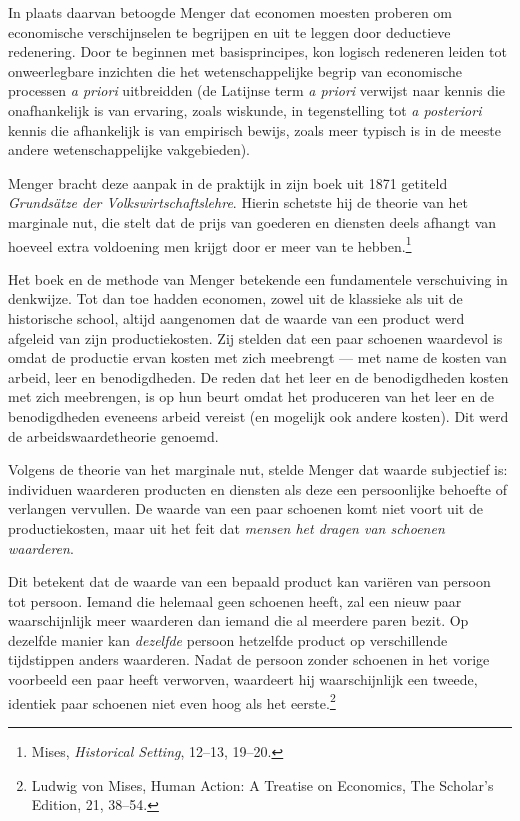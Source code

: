 \documentclass[
  a5paper,
  smalldemyvopaper,11pt,twoside,onecolumn,openright,extrafontsizes,
hidelinks]{memoir}
\begin{document}
In plaats daarvan betoogde Menger dat economen moesten proberen om
economische verschijnselen te begrijpen en uit te leggen door deductieve
redenering. Door te beginnen met basisprincipes, kon logisch redeneren
leiden tot onweerlegbare inzichten die het wetenschappelijke begrip van
economische processen \emph{a priori} uitbreidden (de Latijnse term
\emph{a priori} verwijst naar kennis die onafhankelijk is van ervaring,
zoals wiskunde, in tegenstelling tot \emph{a posteriori} kennis die
afhankelijk is van empirisch bewijs, zoals meer typisch is in de meeste
andere wetenschappelijke vakgebieden).

Menger bracht deze aanpak in de praktijk in zijn boek uit 1871 getiteld
\emph{Grundsätze der Volkswirtschaftslehre}. Hierin schetste hij de
theorie van het marginale nut, die stelt dat de prijs van goederen en
diensten deels afhangt van hoeveel extra voldoening men krijgt door er
meer van te hebben.\footnote{\hspace{0pt}Mises, \emph{Historical
  Setting}, 12--13, 19--20.}

Het boek en de methode van Menger betekende een fundamentele
verschuiving in denkwijze. Tot dan toe hadden economen, zowel uit de
klassieke als uit de historische school, altijd aangenomen dat de waarde
van een product werd afgeleid van zijn productiekosten. Zij stelden dat
een paar schoenen waardevol is omdat de productie ervan kosten met zich
meebrengt --- met name de kosten van arbeid, leer en benodigdheden. De
reden dat het leer en de benodigdheden kosten met zich meebrengen, is op
hun beurt omdat het produceren van het leer en de benodigdheden eveneens
arbeid vereist (en mogelijk ook andere kosten). Dit werd de
arbeidswaardetheorie genoemd.

Volgens de theorie van het marginale nut, stelde Menger dat waarde
subjectief is: individuen waarderen producten en diensten als deze een
persoonlijke behoefte of verlangen vervullen. De waarde van een paar
schoenen komt niet voort uit de productiekosten, maar uit het feit dat
\emph{mensen het dragen van schoenen waarderen}.

Dit betekent dat de waarde van een bepaald product kan variëren van
persoon tot persoon. Iemand die helemaal geen schoenen heeft, zal een
nieuw paar waarschijnlijk meer waarderen dan iemand die al meerdere
paren bezit. Op dezelfde manier kan \emph{dezelfde} persoon hetzelfde
product op verschillende tijdstippen anders waarderen. Nadat de persoon
zonder schoenen in het vorige voorbeeld een paar heeft verworven,
waardeert hij waarschijnlijk een tweede, identiek paar schoenen niet
even hoog als het eerste.\footnote{\hspace{0pt}Ludwig von Mises, Human
  Action: A Treatise on Economics, The Scholar's Edition, 21, 38--54.}
\end{document}
